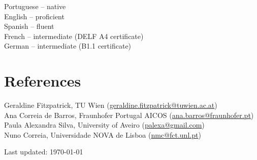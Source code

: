 \documentclass[11pt, a4paper]{article} %
\begin{document}
Portuguese -- native\\
English -- proficient\\
Spanish -- fluent\\
French -- intermediate (DELF A4 certificate)\\
German -- intermediate (B1.1 certificate)\\

\section*{References}

Geraldine Fitzpatrick, TU Wien (\href{mailto:geraldine.fitzpatrick@tuwien.ac.at}{geraldine.fitzpatrick@tuwien.ac.at})\\
Ana Correia de Barros, Fraunhofer Portugal AICOS
(\href{mailto:ana.barros@fraunhofer.pt}{ana.barros@fraunhofer.pt})\\
Paula Alexandra Silva, University of Aveiro (\href{mailto:palexa@gmail.com}{palexa@gmail.com})\\
Nuno Correia, Universidade NOVA de Lisboa (\href{mailto:nmc@fct.unl.pt}{nmc@fct.unl.pt})\\





\begin{center}
{\scriptsize Last updated: \today\ } %
\end{center}

\end{document}
